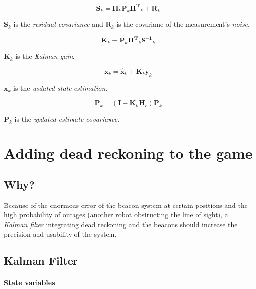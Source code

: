 \documentclass[a4paper, 12pt]{paper}
\begin{document}
\begin{equation}
    \mathbf{S}_k = \mathbf{H}_k \mathbf{P}_k \mathbf{H^T}_k + \mathbf{R}_k
\label{eq:residual_cov}
\end{equation}

$\mathbf{S}_k$ is the \emph{residual covariance} and $\mathbf{R}_k$ is the covariane
of the measurement's \emph{noise}.

\begin{equation}
    \mathbf{K}_k = \mathbf{P}_k \mathbf{H^T}_k \mathbf{S^{-1}}_k
\label{eq:kalman_gain}
\end{equation}

$\mathbf{K}_k$ is the \emph{Kalman gain}.

\begin{equation}
    \mathbf{x}_k = \mathbf{\hat x}_k + \mathbf{K}_k \mathbf{y}_k
\label{eq:updated_extimate}
\end{equation}

$\mathbf{x}_k$ is the \emph{updated state estimation}.

\begin{equation}
    \mathbf{P}_k = \left( \mathbf{I} - \mathbf{K}_k \mathbf{H}_k \right) \mathbf{P}_k
\label{eq:updated_cov}
\end{equation}

$\mathbf{P}_k$ is the \emph{updated estimate covariance}.

\section{Adding dead reckoning to the game}

\subsection{Why?}

Because of the enormous error of the beacon system at certain positions and the
high probability of outages (another robot obstructing the line of sight), a
\emph{Kalman filter} integrating dead reckoning and the beacons should increase
the precision and usability of the system.

\subsection{Kalman Filter}
\paragraph{State variables}
\end{document}
